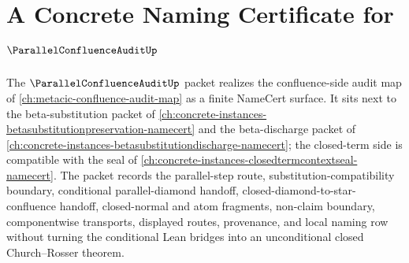 \chapter{A Concrete Naming Certificate for $\ParallelConfluenceAuditUp$}
\label{ch:concrete-instances-parallelconfluenceaudit-namecert}

The $\ParallelConfluenceAuditUp$ packet realizes the confluence-side audit map of \autoref{ch:metacic-confluence-audit-map} as a finite NameCert surface. It sits next to the beta-substitution packet of \autoref{ch:concrete-instances-betasubstitutionpreservation-namecert} and the beta-discharge packet of \autoref{ch:concrete-instances-betasubstitutiondischarge-namecert}; the closed-term side is compatible with the seal of \autoref{ch:concrete-instances-closedtermcontextseal-namecert}. The packet records the parallel-step route, substitution-compatibility boundary, conditional parallel-diamond handoff, closed-diamond-to-star-confluence handoff, closed-normal and atom fragments, non-claim boundary, componentwise transports, displayed routes, provenance, and local naming row without turning the conditional Lean bridges into an unconditional closed Church--Rosser theorem.

